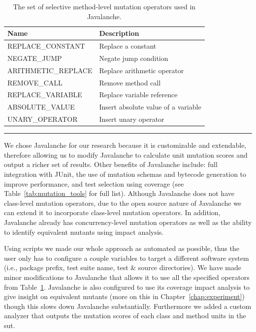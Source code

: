 \begin{table}[!tb]
  \centering
  \begin{tabular}{|l|l|}
    \hline
    \rowcolor[RGB]{169,196,223}
    \textbf{Name} & \textbf{Description} \\
    \hline REPLACE\_CONSTANT & Replace a constant \\
    \hline NEGATE\_JUMP & Negate jump condition \\
    \hline ARITHMETIC\_REPLACE & Replace arithmetic operator \\
    \hline REMOVE\_CALL & Remove method call \\
    \hline REPLACE\_VARIABLE & Replace variable reference\\
    \hline ABSOLUTE\_VALUE & Insert absolute value of a variable \\
    \hline UNARY\_OPERATOR & Insert unary operator \\
    \hline
  \end{tabular}
  \caption{The set of selective method-level mutation operators used in Javalanche.}
  \label{tab:javalanche_operators}
  \vspace{2mm}
  \hrule
\end{table}

We chose Javalanche for our research because it is customizable and extendable, therefore allowing us to modify Javalanche to calculate unit mutation scores and output a richer set of results. Other benefits of Javalanche include: full integration with JUnit, the use of mutation schemas and bytecode generation to improve performance, and test selection using coverage (see Table~\ref{tab:mutation_tools} for full list). Although Javalanche does not have class-level mutation operators, due to the open source nature of Javalanche we can extend it to incorporate class-level mutation operators. In addition, Javalanche already has concurrency-level mutation operators as well as the ability to identify equivalent mutants using impact analysis.

Using scripts we made our whole approach as automated as possible, thus the user only has to configure a couple variables to target a different software system (i.e., package prefix, test suite name, test \& source directories). We have made minor modifications to Javalanche that allows it to use all the specified operators from Table~\ref{tab:javalanche_operators}. Javalanche is also configured to use its coverage impact analysis to give insight on equivalent mutants (more on this in Chapter~\ref{chap:experiment}) though this slows down Javalanche substantially. Furthermore we added a custom analyzer that outputs the mutation scores of each class and method units in the \gls{sut}.

